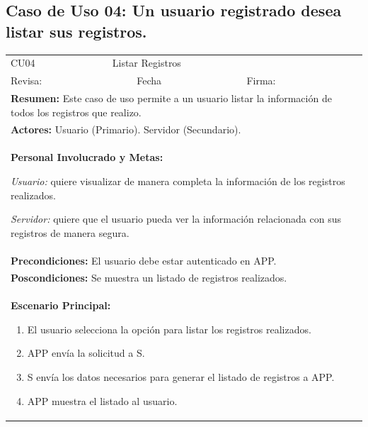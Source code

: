 		\subsection{Caso de Uso 04: Un usuario registrado desea listar sus registros.}
			\begin{longtable}{|l|p{5.5cm}|l|p{2cm}|l|p{1.9cm}|} \hline
				\cellcolor{grisOscuro} CU04 & \multicolumn{4}{|l|}{  \cellcolor{grisOscuro} Listar Registros} &  \cellcolor{grisClaro}\multirow{2}{1cm}{} \\ \cline{1-5}
				\cellcolor{grisOscuro} Revisa: &  \cellcolor{grisClaro} &  \cellcolor{grisOscuro} Fecha &  \cellcolor{grisClaro} &  \cellcolor{grisOscuro} Firma: & \cellcolor{grisClaro} \\ \hline
				\multicolumn{6}{|p{15cm}|}{ \textbf{Resumen: } Este caso de uso permite a un usuario listar la información de todos los registros que realizo.

				} \\ \hline

				\multicolumn{6}{|p{15cm}|}{ \textbf{Actores: } Usuario (Primario). Servidor (Secundario).

				} \\ \hline

				\multicolumn{6}{|p{15cm}|}{ \textbf{Personal Involucrado y Metas: }

				\emph{Usuario:} quiere visualizar de manera completa la información de los registros realizados.

				\emph{Servidor:} quiere que el usuario pueda ver la información relacionada con sus registros de manera segura.

				} \\ \hline

				\multicolumn{6}{|p{15cm}|}{ \textbf{Precondiciones: } El usuario debe estar autenticado en APP.

				} \\ \hline

				\multicolumn{6}{|p{15cm}|}{ \textbf{Poscondiciones: } Se muestra un listado de registros realizados.

				} \\ \hline

				\multicolumn{6}{|p{15cm}|}{ \textbf{Escenario Principal: }

				\begin{enumerate}
					\item El usuario selecciona la opción para listar los registros realizados.
					\item APP envía la solicitud a S.
					\item S envía los datos necesarios para generar el listado de registros a APP.
					\item APP muestra el listado al usuario.
				\end{enumerate}

}
\end{longtable}
